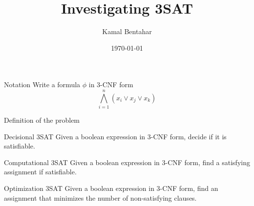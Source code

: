 \documentclass[12pt]{beamer}
\author{Kamal Bentahar}
\title{Investigating 3SAT}
\date{\today}
\begin{document}
	\maketitle
	
\begin{frame}{Notation}
	Write a formula $\phi$ in 3-CNF form
	\[
	\bigwedge_{i=1}^n (x_i\lor x_j\lor x_k)
	\]
\end{frame}

\begin{frame}{Definition of the problem}
	\begin{block}{Decisional 3SAT}
		Given a boolean expression in 3-CNF form, decide if it is satisfiable.
	\end{block}

	\begin{block}{Computational 3SAT}
		Given a boolean expression in 3-CNF form, find a satisfying assignment if satisfiable.
	\end{block}

	\begin{block}{Optimization 3SAT}
		Given a boolean expression in 3-CNF form, find an assignment that minimizes the number of non-satisfying clauses.
	\end{block}
\end{frame}
\end{document}
